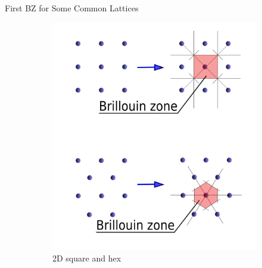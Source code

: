 \documentclass[aspectratio=169]{beamer}
\begin{document}
    \begin{frame}{First BZ for Some Common Lattices}

        \begin{figure}
            \centering
            \begin{subfigure}{0.24\textwidth}
                \includegraphics[width=\linewidth]{lectures/figures/7_Brillouin_Zone_2D.png}
                \caption{2D square and hex}
            \end{subfigure}
            \begin{subfigure}{0.24\textwidth}

\end{subfigure}
\end{figure}
\end{frame}
\end{document}
